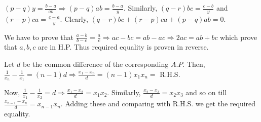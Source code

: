   $(p - q)y = \frac{b - a}{ab}\Rightarrow (p - q)ab = \frac{b - a}{y}$. Similarly, $(q - r)bc = \frac{c -
  b}{y}$ and $(r - p)ca = \frac{c - a}{y}$. Clearly, $(q - r)bc + (r - p)ca + (p - q)ab = 0$.
\item We have to prove that $\frac{a - b}{b - c} = \frac{a}{c}\Rightarrow ac - bc = ab - ac \Rightarrow 2ac
  = ab + bc$ which prove that $a, b, c$ are in H.P. Thus required equality is proven in reverse.
\item Let $d$ be the common difference of the corresponding $A.P.$ Then, $\frac{1}{x_n} - \frac{1}{x_1} = (n
  - 1)d \Rightarrow \frac{x_1 - x_n}{d} = (n - 1)x_1x_n =$ R.H.S.

  Now, $\frac{1}{x_1} - \frac{1}{x_2} = d \Rightarrow \frac{x_1 - x_2}{d} = x_1x_2$. Similarly, $\frac{x_2
    - x_3}{d} = x_2x_3$ and so on till $\frac{x_{n - 1} - x_n}{d} = x_{n - 1}x_n$. Adding these and
  comparing with R.H.S. we get the required equality.
\stopitemize
